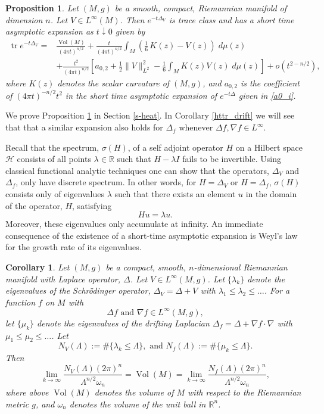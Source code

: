 \documentclass[letterpaper,12pt]{amsart}
\newtheorem{prop}[thm]{Proposition}
\def \R{\mathbb R}
\def \n{\nabla}
\def \n{\nabla}
\def \eref{\eqref}
\newcommand{\tr}{\mathop{\mathrm{tr}}}
\newcommand{\Vol}{\operatorname{Vol}}
\newtheorem{cor}[thm]{Corollary}
\begin{document}
\begin{prop} \label{prophttr}Let $(M, g)$ be a smooth, compact, Riemannian manifold of dimension $n$.  Let $V \in L^\infty (M)$.  Then $e^{-t \Delta_V}$ is trace class and has a short time asymptotic expansion as $t \downarrow 0$ given by
\begin{equation*}
\begin{split}
\tr e^{-t \Delta_V} = & \frac{\Vol (M)}{(4\pi t)^{n/2}} + \frac{t}{(4\pi t)^{n/2}} \int_M \left( \frac{1}{6} \, K(z)   - V(z)  \right) \;d\mu (z) \\
& +  \frac{t^2}{(4\pi t)^{n/2}}  \left[a_{0,2} + \frac{1}{2} \|V\|_{L^2} ^2 - \frac{1}{6} \int_M  K(z) V(z)  \;d\mu (z)  \right] + o(t^{2-n/2}),
\end{split}
\end{equation*}
where $K(z)$ denotes the scalar curvature of $(M,g)$, and $a_{0,2}$  is the coefficient of $(4\pi t)^{-n/2}t^{2}$
in the short time asymptotic expansion of $e^{-t \Delta}$ given in \eref{a0_i}.
\end{prop}
We prove Proposition \ref{prophttr} in Section \ref{s-heat}. In Corollary \ref{httr_drift} we will see that that a similar expansion also holds for $\Delta_f$ whenever $\Delta f,\n f \in L^\infty$.


Recall that the spectrum, $\sigma(H)$, of a self adjoint operator $H$ on a Hilbert space $\mathcal{H}$ consists of all points $\lambda \in \mathbb{R}$ such that $H-\lambda I$ fails to be invertible. Using classical functional analytic techniques one can show that the operators, $\Delta_V$ and $\Delta_f$,  only have discrete spectrum. In other words, for $H=\Delta_V$ or $H=\Delta_f$, $\sigma(H)$ consists only of eigenvalues $\lambda$ such that there exists an element $u$ in the domain of the operator, $H$, satisfying
\[
H u = \lambda u.
\]
Moreover, these eigenvalues only accumulate at infinity.  An immediate consequence of the existence of a short-time asymptotic expansion is Weyl's law for the growth rate of its eigenvalues.
\begin{cor} \label{th-weyl}
Let $(M,g)$ be a compact, smooth, $n$-dimensional Riemannian manifold with Laplace operator, $\Delta$.  Let $V \in L^\infty(M,g)$.
Let $\{\lambda_k\}$ denote the eigenvalues of the Schr\"odinger operator, $\Delta_V = \Delta + V$ with $\lambda_1 \leq \lambda_2 \leq \ldots$.  For a function $f$ on $M$ with
$$\Delta f \textrm{ and } \nabla f \in L^\infty(M, g),$$
let $\{\mu_k\}$ denote the eigenvalues of the drifting Laplacian $\Delta_f = \Delta + \nabla f \cdot \nabla$ with $\mu_1 \leq \mu_2 \leq \ldots $.
Let
$$N_V(\Lambda) := \# \{ \lambda_k \leq \Lambda\}, \textrm{ and } N_f (\Lambda) := \# \{ \mu_k \leq \Lambda \}.$$
Then
$$\lim_{k \to \infty} \frac{N_V(\Lambda) (2\pi)^n}{\Lambda^{n/2} \omega_n} = \Vol (M) = \lim_{k \to \infty} \frac{N_f(\Lambda) (2\pi)^n}{\Lambda^{n/2} \omega_n},$$
where above $\Vol(M)$ denotes the volume of $M$ with respect to the Riemannian metric $g$, and $\omega_n$ denotes the volume of the unit ball in $\R^n$.
\end{cor}
\end{document}
